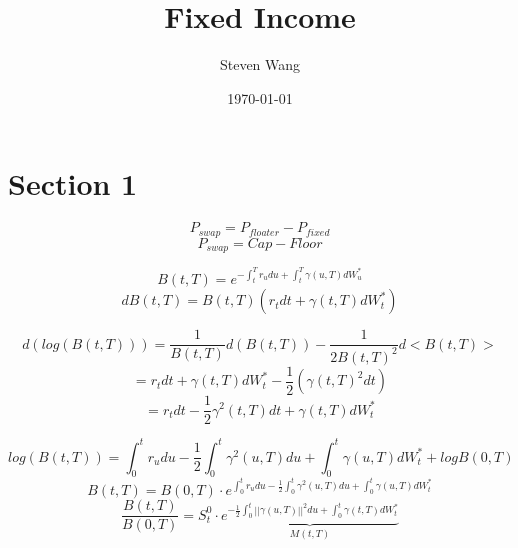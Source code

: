 \documentclass[12pt]{article}
\begin{document}
\title{Fixed Income}
\author{Steven Wang}
\date{\today}
\maketitle

\tableofcontents

\section{Section 1}
$$P_{swap}=P_{floater}-P_{fixed}$$
$$P_{swap}=Cap-Floor$$

$$B(t,T)=e^{-\int_t^T r_u du+\int_t^T \gamma(u,T)dW_u^*}$$
$$dB(t,T)=B(t,T)(r_t dt+\gamma(t,T)dW_t^*)$$

$$d(log(B(t,T)))=\frac{1}{B(t,T)}d(B(t,T))-\frac{1}{2B(t,T)^2}d<B(t,T)>$$
$$=r_t dt+\gamma(t,T)dW_t^*-\frac{1}{2}(\gamma(t,T)^2 dt)$$
$$=r_t dt-\frac{1}{2}\gamma^2(t,T)dt+\gamma(t,T)dW_t^*$$

$$log(B(t,T))=\int_0^t r_u du-\frac{1}{2}\int_0^t\gamma^2(u,T)du+\int_0^t\gamma(u,T)dW_t^*+logB(0,T)$$
$$B(t,T)=B(0,T)\cdot e^{\int_0^t r_u du-\frac{1}{2}\int_0^t\gamma^2(u,T)du+\int_0^t\gamma(u,T)dW_t^*}$$
$$\frac{B(t,T)}{B(0,T)}=S_t^0\cdot \underbrace{e^{-\frac{1}{2}\int_0^t||\gamma(u,T)||^2du+\int_0^t\gamma(t,T)dW_t^*}}_{M(t,T)}$$
\end{document}
